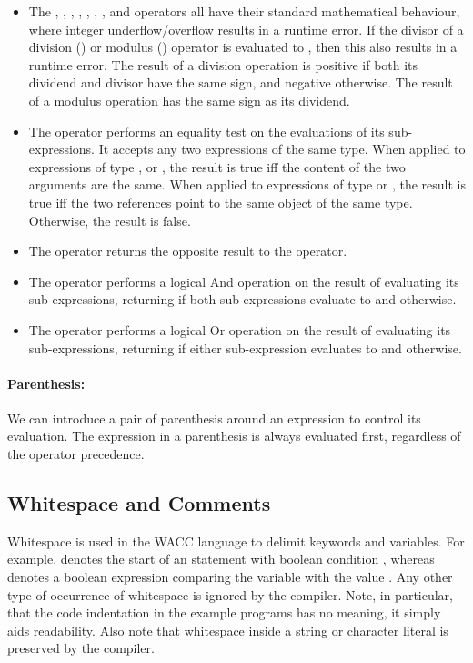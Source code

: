 \documentclass[a4paper]{article}
\theoremstyle{definition}
\begin{document}
\begin{itemize}
\item The \lit{*}, \lit{/}, \lit{\%}, \lit{+}, \lit{-}, \lit{>}, \lit{>=}, \lit{<} and \lit{<=} operators 
all have their standard mathematical behaviour, where integer underflow/overflow results in a runtime error.
If the divisor of a division (\lit{/}) or modulus (\lit{\%}) operator is evaluated to , then this also results in a runtime error.
The result of a division operation is positive if both its dividend and divisor have the same sign, and negative otherwise.
The result of a modulus operation has the same sign as its dividend.

\item The \lit{==} operator performs an equality test on the evaluations of its sub-expressions.
It accepts any two expressions of the same type.
When applied to expressions of type ,  or , the result is true iff the content of the two arguments are the same.
When applied to expressions of type  or , the result is true iff the two references point to the same object of the same type.
Otherwise, the result is false. 

\item The \lit{!=} operator returns the opposite result to the \lit{==} operator. 

\item The \lit{\&\&} operator performs a logical And operation on the result of evaluating its sub-expressions,
returning  if both sub-expressions evaluate to  and  otherwise. 

\item The \lit{||} operator performs a logical Or operation on the result of evaluating its sub-expressions,
returning  if either sub-expression evaluates to  and  otherwise.
\end{itemize}

\paragraph{Parenthesis:}
We can introduce a pair of parenthesis around an expression to control its evaluation. 
The expression in a parenthesis is always evaluated first, regardless of the operator precedence. 

\subsection{Whitespace and Comments}
Whitespace is used in the WACC language to delimit keywords and variables.
For example,  denotes the start of an  statement with boolean condition , 
whereas  denotes a boolean expression comparing the variable  with the value .
Any other type of occurrence of whitespace is ignored by the compiler.
Note, in particular, that the code indentation in the example programs has no meaning, it simply aids readability. 
Also note that whitespace inside a string or character literal is preserved by the compiler. 
\end{document}
